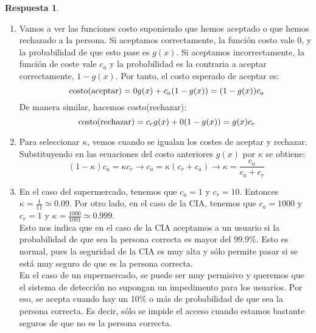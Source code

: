\documentclass[10pt,a4paper]{article}
\theoremstyle{definition}
\newtheorem*{respuesta}{Respuesta}
\begin{document}
\newpage
\begin{respuesta}
\begin{enumerate}
\hfill \break
\item Vamos a ver las funciones costo suponiendo que hemos aceptado o que hemos rechazado a la persona. Si aceptamos correctamente, la función costo vale 0, y la probabilidad de que esto pase es $g(x)$. Si aceptamos incorrectamente, la función de coste vale $c_a$ y la probabilidad es la contraria a aceptar correctamente, $1-g(x)$. Por tanto, el costo esperado de aceptar es:
\[
\ \hbox{costo(aceptar)} = 0 g(x) + c_a(1-g(x)) = (1-g(x)) c_a
\]
De manera similar, hacemos costo(rechazar):
\[
\ \hbox{costo(rechazar)} = c_r g(x) + 0(1-g(x)) = g(x) c_r
\]
\item Para seleccionar $\kappa$, vemos cuando se igualan los costes de aceptar y rechazar. Substituyendo en las ecuaciones del costo anteriores $g(x)$ por $\kappa$ se obtiene:
\[
\	(1-\kappa) c_a = \kappa c_r \rightarrow c_a = \kappa(c_r+c_a) \rightarrow \kappa = \frac{c_a}{c_a+c_r}
\]
\item En el caso del supermercado, tenemos que $c_a = 1$ y $c_r = 10$. Entonces $\kappa = \frac{1}{11} \simeq 0.09$. Por otro lado, en el caso de la CIA, tenemos que $c_a = 1000$ y $c_r = 1$ y $\kappa = \frac{1000}{1001} \simeq 0.999$.\\

Esto  nos indica que en el caso de la CIA aceptamos a un usuario si la probabilidad de que sea la persona correcta es mayor del 99.9$\%$. Esto es normal, pues la seguridad de la CIA es muy alta y sólo permite pasar si se está muy seguro de que es la persona correcta.\\

En el caso de un supermercado, se puede ser muy permisivo y queremos que el sistema de detección no supongan un impedimento para los usuarios. Por eso, se acepta cuando hay un 10$\%$ o más de probabilidad de que sea la persona correcta. Es decir, sólo se impide el acceso cuando estamos bastante seguros de que no es la persona correcta.\\

\end{enumerate}
\end{respuesta}

\newpage
\end{document}
